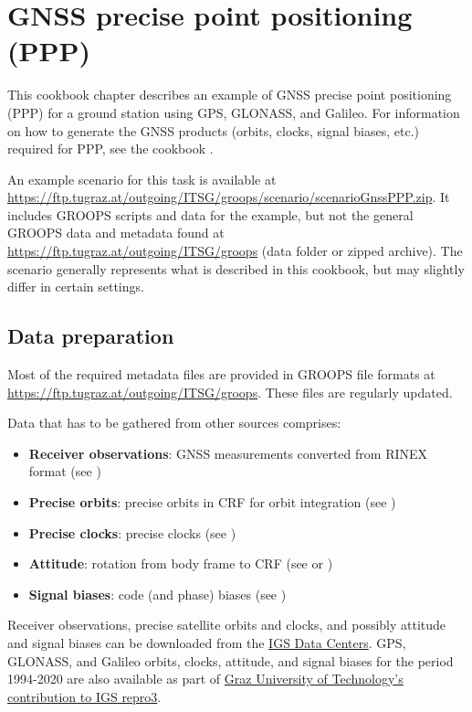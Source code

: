 \section{GNSS precise point positioning (PPP)}\label{cookbook.gnssPpp}
This cookbook chapter describes an example of GNSS precise point positioning (PPP) for a ground station using GPS, GLONASS, and Galileo.
For information on how to generate the GNSS products (orbits, clocks, signal biases, etc.) required for PPP,
see the cookbook .

An example scenario for this task is available at \url{https://ftp.tugraz.at/outgoing/ITSG/groops/scenario/scenarioGnssPPP.zip}.
It includes GROOPS scripts and data for the example, but not the general GROOPS data and metadata found at \url{https://ftp.tugraz.at/outgoing/ITSG/groops} (data folder or zipped archive).
The scenario generally represents what is described in this cookbook, but may slightly differ in certain settings.

\subsection{Data preparation}\label{cookbook.gnssPpp:metadata}
Most of the required metadata files are provided in GROOPS file formats at \url{https://ftp.tugraz.at/outgoing/ITSG/groops}.
These files are regularly updated.

Data that has to be gathered from other sources comprises:
\begin{itemize}
  \item \textbf{Receiver observations}: GNSS measurements converted from RINEX format (see )
  \item \textbf{Precise orbits}: precise orbits in CRF for orbit integration (see )
  \item \textbf{Precise clocks}: precise clocks (see )
  \item \textbf{Attitude}: rotation from body frame to CRF (see  or )
  \item \textbf{Signal biases}: code (and phase) biases (see )
\end{itemize}
Receiver observations, precise satellite orbits and clocks, and possibly attitude and signal biases can be downloaded from the
\href{https://igs.org/data-products-overview/}{IGS Data Centers}.
GPS, GLONASS, and Galileo orbits, clocks, attitude, and signal biases for the period 1994-2020 are also available as part of
\href{https://doi.org/10.3217/dataset-4528-0723-0867}{Graz University of Technology's contribution to IGS repro3}.

